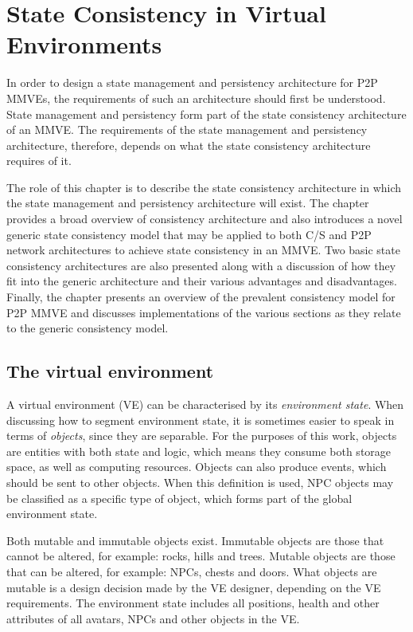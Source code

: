 \chapter{State Consistency in Virtual Environments}
\label{chp:CONSISTENCY}

In order to design a state management and persistency architecture for P2P MMVEs, the requirements of such an architecture should first be understood. State management and persistency form part of the state consistency architecture of an MMVE. The requirements of the state management and persistency architecture, therefore, depends on what the state consistency architecture requires of it.

The role of this chapter is to describe the state consistency architecture in which the state management and persistency architecture will exist. The chapter provides a broad overview of consistency architecture and also introduces a novel generic state consistency model that may be applied to both C/S and P2P network architectures to achieve state consistency in an MMVE. Two basic state consistency architectures are also presented along with a discussion of how they fit into the generic architecture and their various advantages and disadvantages. Finally, the chapter presents an overview of the prevalent consistency model for P2P MMVE and discusses implementations of the various sections as they relate to the generic consistency model.

\section{The virtual environment}

A virtual environment (VE) can be characterised by its \emph{environment state}. When discussing how to segment environment state, it is sometimes easier to speak in terms of \emph{objects}, since they are separable. For the purposes of this work, objects are entities with both state and logic, which means they consume both storage space, as well as computing resources. Objects can also produce events, which should be sent to other objects. When this definition is used, NPC objects may be classified as a specific type of object, which forms part of the global environment state.

Both mutable and immutable objects exist. Immutable objects are those that cannot be altered, for example: rocks, hills and trees. Mutable objects are those that can be altered, for example: NPCs, chests and doors. What objects are mutable is a design decision made by the VE designer, depending on the VE requirements. The environment state includes all positions, health and other attributes of all avatars, NPCs and other objects in the VE.

